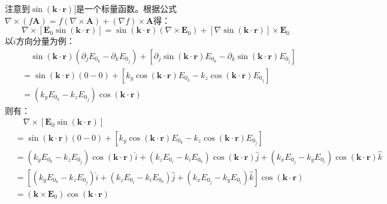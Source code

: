 \documentclass[a4paper,fontset=none]{ctexart}
\begin{document}
\begin{itemize}
        \textparagraph 注意到$\sin(\bm{k}\cdot\bm{r})]$是一个标量函数。根据公式$\nabla\times(f\bm{A}) = f(\nabla\times\bm{A}) + (\nabla f)\times\bm{A}$得：
        \[
            \nabla\times[\bm{E}_0\sin(\bm{k}\cdot\bm{r})] = \sin(\bm{k}\cdot\bm{r})(\nabla\times\bm{E}_0) + [\nabla\sin(\bm{k}\cdot\bm{r})]\times\bm{E}_0
        \]
        以$\hat{i}$方向分量为例：
        \begin{align*}
            &\quad \sin(\bm{k}\cdot\bm{r})(\partial_j E_{0_k} - \partial_k E_{0_j}) + \left[\partial_j\sin(\bm{k}\cdot\bm{r})E_{0_k} - \partial_k\sin(\bm{k}\cdot\bm{r})E_{0_j}\right] \\
            &= \sin(\bm{k}\cdot\bm{r})(0 - 0) + \left[k_y\cos(\bm{k}\cdot\bm{r})E_{0_k} - k_z\cos(\bm{k}\cdot\bm{r})E_{0_j}\right] \\
            &= (k_y E_{0_k} - k_z E_{0_j})\cos(\bm{k}\cdot\bm{r})
        \end{align*}
        则有：
        \begin{align*}
            &\quad \nabla\times[\bm{E}_0\sin(\bm{k}\cdot\bm{r})] \\
            &= \sin(\bm{k}\cdot\bm{r})(0 - 0) + \left[k_y\cos(\bm{k}\cdot\bm{r})E_{0_k} - k_z\cos(\bm{k}\cdot\bm{r})E_{0_j}\right] \\
            &= (k_y E_{0_k} - k_z E_{0_j})\cos(\bm{k}\cdot\bm{r})\hat{i} + (k_z E_{0_i} - k_i E_{0_k})\cos(\bm{k}\cdot\bm{r})\hat{j} + (k_x E_{0_j} - k_y E_{0_i})\cos(\bm{k}\cdot\bm{r})\hat{k} \\
            &= \left[(k_y E_{0_k} - k_z E_{0_j})\hat{i} + (k_z E_{0_i} - k_i E_{0_k})\hat{j} + (k_x E_{0_j} - k_y E_{0_i})\hat{k}\right]\cos(\bm{k}\cdot\bm{r}) \\
            &= (\bm{k}\times\bm{E}_0)\cos(\bm{k}\cdot\bm{r})
        \end{align*}


\end{itemize}
\end{document}

